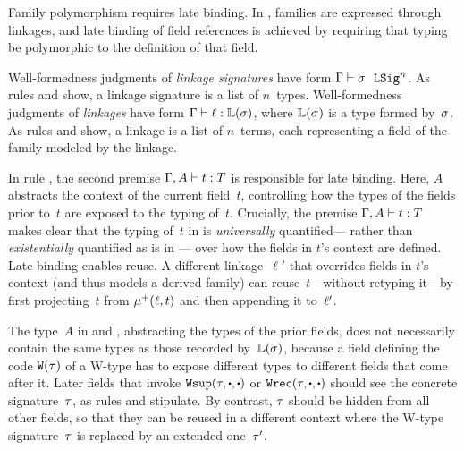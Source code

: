 
Family polymorphism requires late binding.
In \TT, families are expressed through linkages, and late binding of
field references is achieved by requiring that typing be polymorphic to
the definition of that field.

Well-formedness judgments of \emph{linkage signatures} have form
$ {\Gamma} \vdash {\ensuremath{\sigma}} \ \ \texttt{LSig}^{n} $.
As rules  and  show, a linkage
signature is a list of $n$~types.
%
Well-formedness judgments of \emph{linkages} have form $ {\Gamma} \vdash {\ensuremath{\ell}} : {\mathbb{L}({\sigma})} $,
where $\mathbb{L}({\sigma})$ is a type formed by~$\sigma$.
As rules  and  show, a linkage is a list
of $n$~terms, each representing a field of the family modeled by the linkage.

In rule , the second premise $ {\Gamma, A} \vdash {t} : {T} $ is
responsible for late binding.
Here, $A$ abstracts the context of the current field~$t$, controlling
how the types of the fields prior to~$t$ are exposed to the typing of~$t$.
Crucially, %
the premise $ {\Gamma, A} \vdash {t} : {T} $ makes clear that
the typing of~$t$ in  is \emph{universally} quantified---%
rather than \emph{existentially} quantified as is in ---%
over how the fields in $t$'s context are defined.
Late binding enables reuse.
A different linkage~$\ell'$ that overrides fields in $t$'s context (and thus models a derived family)
can reuse~$t$---without retyping it---by first
projecting~$t$ from $\mu^+({\ell},{t})$ and then appending it to~$\ell'$.

The type~$A$ in  and ,
abstracting the types of the prior fields, does not necessarily contain the same types as those recorded by~$\mathbb{L}({\sigma})$,
because a field defining the code $\texttt{W}({\tau})$ of a W-type has to
expose different types to different fields that come after it.
Later fields that invoke
$\Wsup{\wsig}{\cDot}{\cDot}$ or $\Wrec{\wsig}{\cDot}{\cDot}$
should see the concrete signature~$\tau$, as rules 
and  stipulate.
By contrast, $\tau$ should be hidden
from all other fields, so that they can be reused
in a different context where the W-type signature~$\tau$ is replaced by an extended one~$\tau'$.


